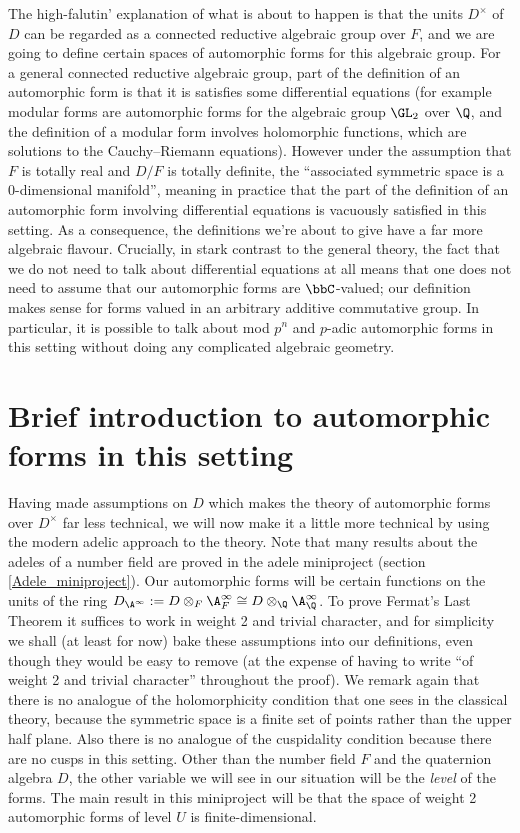The high-falutin' explanation of what is about to happen is that the units $D^\times$ of $D$
can be regarded as a connected reductive algebraic group over $F$, and we are going to define certain spaces
of automorphic forms for this algebraic group. For a general connected reductive algebraic group,
part of the definition of an automorphic form is that it is satisfies some differential
equations (for example modular forms are automorphic forms for the algebraic group $\GL_2$ over
$\Q$, and the definition of a modular form involves holomorphic functions, which are solutions to
the Cauchy--Riemann equations). However under the assumption that $F$ is totally real and $D/F$ is
totally definite, the ``associated symmetric space is a 0-dimensional manifold'', meaning in practice that
the part of the definition of an automorphic form involving differential equations is vacuously satisfied in this setting.
As a consequence, the definitions we're about to give have a far more algebraic flavour. Crucially, in stark
contrast to the general theory, the fact that we do not need to talk about differential equations at all means that one does
not need to assume that our automorphic forms are $\bbC$-valued; our definition makes sense for forms valued in an arbitrary additive commutative group.
In particular, it is possible to talk about mod $p^n$ and $p$-adic automorphic forms in this setting without doing any complicated algebraic geometry.

\section{Brief introduction to automorphic forms in this setting}

Having made assumptions on $D$ which makes the theory of automorphic forms over $D^\times$
far less technical, we will now make it a little more technical by using the modern adelic
approach to the theory. Note that many results about the adeles of a number field are proved
in the adele miniproject (section \ref{Adele_miniproject}). Our automorphic forms will be certain
functions on the units of the ring $D_{\A^\infty}:=D\otimes_F\A_F^\infty\cong D\otimes_{\Q}\A_{\Q}^\infty$.
To prove Fermat's Last Theorem it suffices to work in weight 2 and trivial character, and for simplicity we shall (at least for now)
bake these assumptions into our definitions, even though they would be easy to remove (at the expense of having
to write ``of weight 2 and trivial character'' throughout the proof). We remark again that
there is no analogue of the holomorphicity condition that one sees in the classical theory,
because the symmetric space is a finite set of points rather than the upper half plane. Also
there is no analogue of the cuspidality condition because there are no cusps in this setting.
Other than the number field $F$ and the quaternion algebra $D$, the other variable we will see in our situation
will be the \emph{level} of the forms. The main result in this miniproject will be that the space of weight 2 automorphic forms of level $U$
is finite-dimensional.

